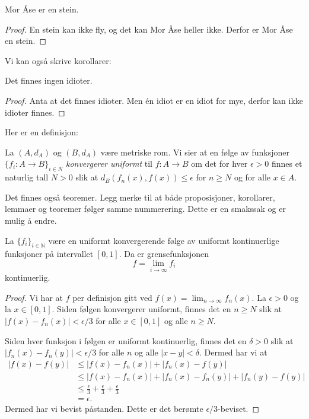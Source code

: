 \documentclass[a4paper, norsk]{article}  %
\newcommand{\N}{\mathbb{N}}
\begin{document}
\begin{prop}
    \label{prop:morase}
    Mor Åse er en stein.
\end{prop}

\begin{proof}
    En stein kan ikke fly, og det kan Mor Åse heller ikke. Derfor er Mor Åse en stein.
\end{proof}

Vi kan også skrive korollarer:

\begin{corr}
     Det finnes ingen idioter.
\end{corr}

\begin{proof}
    Anta at det finnes idioter. Men én idiot er en idiot for mye, derfor kan ikke idioter finnes.
\end{proof}

Her er en definisjon:

\begin{defi}
    La $(A, d_A)$ og $(B, d_A)$ være metriske rom. Vi sier at en følge av funksjoner $\{f_i \colon A \to B \}_{i \in N}$ \emph{konvergerer uniformt} til $f \colon A \to B$ om det for hver $\epsilon > 0$ finnes et naturlig tall $N > 0$ slik at $d_B(f_n(x), f(x)) \le \epsilon$ for $n \ge N$ og for alle $x \in A$. 
\end{defi}

Det finnes også teoremer. Legg merke til at både proposisjoner, korollarer, lemmaer og teoremer følger samme nummerering. Dette er en smakssak og er mulig å endre.

\begin{thm}
    La $\{ f_i \}_{i \in \N}$ være en uniformt konvergerende følge av uniformt kontinuerlige funksjoner på intervallet $[0, 1]$. Da er grensefunksjonen
\[
    \label{eq:limitfunction}
    f = \lim_{i \to \infty} f_i
\]
kontinuerlig. 
\end{thm}

\begin{proof}
    Vi har at $f$ per definisjon gitt ved $f(x) = \lim_{n \to \infty} f_n(x)$.  La $\epsilon > 0$ og la $x \in [0, 1]$. Siden følgen konvergerer uniformt, finnes det en $n \ge N$ slik at $|f(x) - f_n(x)| < \epsilon / 3$ for alle $x \in [0,1]$ og alle $n \ge N$.

Siden hver funksjon i følgen er uniformt kontinuerlig, finnes det en $\delta > 0$ slik at $|f_n(x) - f_n(y)| < \epsilon / 3$ for alle $n$ og alle $|x - y| < \delta$. Dermed har vi at
\begin{align*}
    |f(x) - f(y)| 
    & \le 
    |f(x) - f_n(x)| + |f_n(x) - f(y)| \\
    & \le 
    |f(x) - f_n(x)| + |f_n(x) - f_n(y)| + |f_n(y) - f(y)| \\ 
    & \le 
    \frac{\epsilon}{3} + \frac{\epsilon}{3} + \frac{\epsilon}{3} \\
    &= 
    \epsilon.
\end{align*}
Dermed har vi bevist påstanden. Dette er det berømte $\epsilon / 3$-beviset.
\end{proof}
\end{document}
